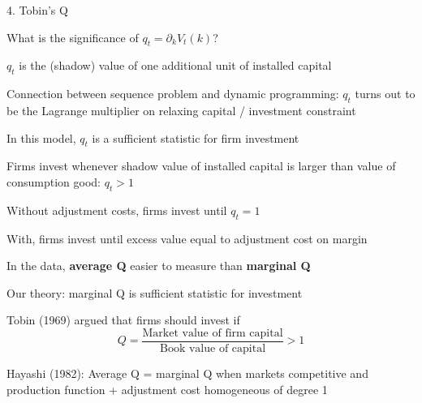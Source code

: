 \documentclass[11pt, aspectratio=169]{beamer}
\newenvironment{witemize}{\itemize\addtolength{\itemsep}{10pt}}{\enditemize}
\begin{document}
\begin{frame}{4. Tobin's Q}
\begin{witemize}
\item What is the significance of $q_t = \partial_k V_t(k)$? 

\item $q_t$ is the (shadow) value of one additional unit of installed capital

\item Connection between sequence problem and dynamic programming: $q_t$ turns out to be the Lagrange multiplier on relaxing capital / investment constraint

\item In this model, $q_t$ is a sufficient statistic for firm investment 

\item Firms invest whenever shadow value of installed capital is larger than value of consumption good: $q_t > 1$

\item Without adjustment costs, firms invest until $q_t = 1$

\item With, firms invest until excess value equal to adjustment cost on margin
\end{witemize}
\end{frame}


\begin{frame}{}
\begin{witemize}
\item In the data, \textbf{average Q} easier to measure than \textbf{marginal Q} 

\item Our theory: marginal Q is sufficient statistic for investment

\item Tobin (1969) argued that firms should invest if 
\begin{equation*}
	Q = \frac{ \text{Market value of firm capital}}{\text{Book value of capital}} > 1
\end{equation*}

\item Hayashi (1982): Average Q = marginal Q when markets competitive and production function + adjustment cost homogeneous of degree 1

\end{witemize}
\end{frame}
\end{document}
